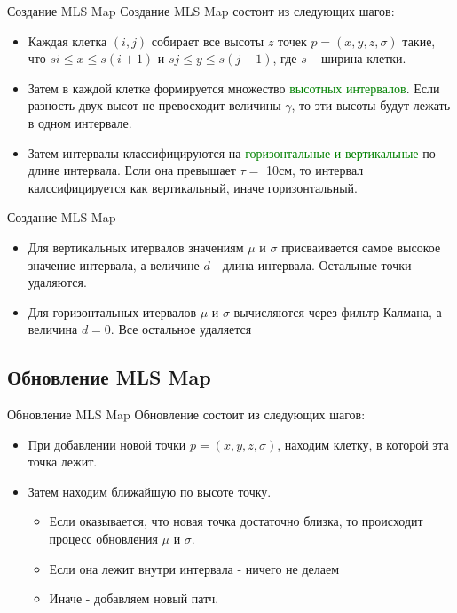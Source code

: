 \documentclass[9pt]{beamer}
\begin{document}
\begin{frame}{Создание MLS Map}
  Создание MLS Map состоит из следующих шагов:
  \begin{itemize}
    \item
    { 
      Каждая клетка $(i,j)$ собирает все высоты $z$ точек $p = (x,y,z, \sigma)$ такие, что 
      $si \leq x \leq s(i+1)$ и $sj \leq y \leq s(j+1)$, где $s$ -- ширина клетки.
    }
    \item
    {
      Затем в каждой клетке формируется множество \textcolor{green}{высотных интервалов}. 
      Если разность двух высот не превосходит величины $\gamma$, то эти высоты будут лежать в одном интервале.
    }
    \item
    {
      Затем интервалы классифицируются на \textcolor{green}{горизонтальные и вертикальные} по длине интервала. 
      Если она превышает $\tau =$ 10см, то интервал калссифицируется как вертикальный, иначе горизонтальный.
    }
    \end{itemize}
\end{frame}

\begin{frame}{Создание MLS Map}
  \begin{itemize}
    \item
    { 
      Для вертикальных итервалов значениям $\mu$ и $\sigma$ присваивается самое высокое значение интервала, а величине $d$ - длина интервала. Остальные точки удаляются.
    }
    \item
    {
      Для горизонтальных итервалов $\mu$ и $\sigma$ вычисляются через фильтр Калмана, а величина $d = 0$. Все остальное удаляется
    }
    \end{itemize}
\end{frame} 

\subsection{Обновление MLS Map}

\begin{frame}{Обновление MLS Map}
 Обновление состоит из следующих шагов:
  \begin{itemize}
    \item
    { 
      При добавлении новой точки $p=(x,y,z, \sigma)$, находим клетку, в которой эта точка лежит.
    }
    \item
    {
      Затем находим ближайшую по высоте точку. 
      \begin{itemize}
        \item
        { 
          Если оказывается, что новая точка достаточно близка, то происходит процесс обновления $\mu$ и $\sigma$.
        }
        \item
        {
          Если она лежит внутри интервала - ничего не делаем
        }
        \item
        {
          Иначе - добавляем новый патч.
        }
      \end{itemize}
    }
  \end{itemize}
\end{frame}
\end{document}
